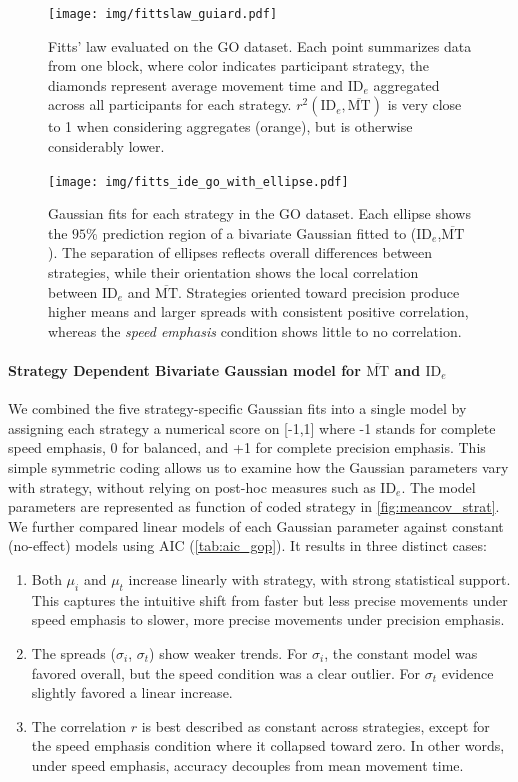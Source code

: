 \documentclass[acmlarge, manuscript,review]{acmart}
\newcommand{\mmt}{\ensuremath{\overline{\mt}}\xspace}
\newcommand{\mt}{\ensuremath{{\text{MT}}}\xspace}
\newcommand{\ide}{\ensuremath{{\text{ID}_e}}\xspace}
\begin{document}
\begin{figure}[htbp]
	\centering
	\texttt{[image: img/fittslaw\_guiard.pdf]}
	\caption{Fitts' law evaluated on the GO dataset. Each point summarizes data from one block, where color indicates participant strategy, the diamonds represent average movement time and \ide aggregated across all participants for each strategy. $r^2(\ide, \mmt)$ is very close to 1 when considering aggregates (orange), but is otherwise considerably lower.}
	\label{fig:fittslaw_guiard}
\end{figure}





\begin{figure}[htbp]
	\centering
	\texttt{[image: img/fitts\_ide\_go\_with\_ellipse.pdf]}
	\caption{Gaussian fits for each strategy in the GO dataset. Each ellipse shows the $95\%$ prediction region of a bivariate Gaussian fitted to (\ide,\mmt). The separation of ellipses reflects overall differences between strategies, while their orientation shows the local correlation between \ide and \mmt. Strategies oriented toward precision produce higher means and larger spreads with consistent positive correlation, whereas the \textit{speed emphasis} condition shows little to no correlation.}
	\label{fig:go_ide}
\end{figure}



\paragraph{Strategy Dependent Bivariate Gaussian model for \mmt and \ide}
We combined the five strategy-specific Gaussian fits into a single model by assigning each strategy a numerical score on [-1,1] where -1 stands for complete speed emphasis, 0 for balanced, and +1 for complete precision emphasis. This simple symmetric coding allows us to examine how the Gaussian parameters vary with strategy, without relying on post-hoc measures such as \ide. The model parameters are represented as function of coded strategy in \autoref{fig:meancov_strat}. We further compared linear models of each Gaussian parameter against constant (no-effect) models using AIC (\autoref{tab:aic_gop}). It results in three distinct cases:
\begin{enumerate}
	\item Both $\mu_i$ and $\mu_t$ increase linearly with strategy, with strong statistical support. This captures the intuitive shift from faster but less precise movements under speed emphasis to slower, more precise movements under precision emphasis.
	\item The spreads ($\sigma_i$, $\sigma_t$) show weaker trends. For $\sigma_i$, the constant model was favored overall, but the speed condition was a clear outlier. For $\sigma_t$ evidence slightly favored a linear increase.
	\item The correlation $r$ is best described as constant across strategies, except for the speed emphasis condition where it collapsed toward zero. In other words, under speed emphasis, accuracy decouples from mean movement time.
\end{enumerate}
\end{document}
